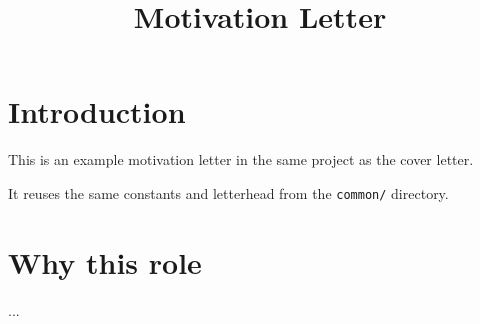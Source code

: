 \documentclass[12pt]{article}
\title{Motivation Letter}
\author{\MyName}
\date{\ProjectDate}
\begin{document}
\maketitle

\section{Introduction}

This is an example motivation letter in the same project as the cover letter.

It reuses the same constants and letterhead from the \texttt{common/} directory.

\section{Why this role}

...
\end{document}
